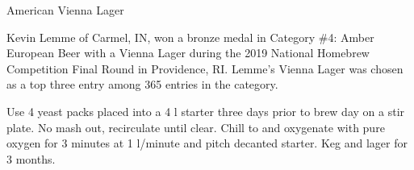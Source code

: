 \stylesection{\styleviennalager}

\begin{recipie}{American Vienna Lager}

\begin{aboutblock}
Kevin Lemme of Carmel, IN, won a bronze medal in Category \#4: Amber European Beer with
a Vienna Lager during the 2019 National Homebrew Competition Final Round in Providence,
RI. Lemme's Vienna Lager was chosen as a top three entry among 365 entries in the category.
\end{aboutblock}


\begin{methodandtiming}
 
\begin{mashsteps}
\end{mashsteps}

\begin{fermentationsteps}
\end{fermentationsteps}

\begin{directions}
Use 4 yeast packs placed into a 4 l starter three days prior to brew day on a stir plate.
No mash out, recirculate until clear. Chill to  and oxygenate with pure oxygen
for 3 minutes at 1 l/minute and pitch decanted starter. Keg and lager for 3 months.
\end{directions}

\end{methodandtiming}

\begin{ingredientsblock}

\begin{malts}
\end{malts}

\begin{hops}
\end{hops}

\begin{yeasts}
\end{yeasts}

\end{ingredientsblock}

\end{recipie}
